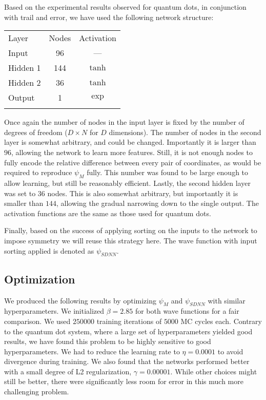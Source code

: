 \documentclass[Thesis.tex]{subfiles}
\begin{document}
Based on the experimental results observed for quantum dots, in conjunction with
trail and error, we have used the following network structure:

\begin{center}
  \begin{tabular}{lcc}
    \toprule
    \addlinespace
    Layer & Nodes & Activation\\
    \addlinespace
    \midrule
    \addlinespace
    \addlinespace
    Input & 96 & ---\\
    Hidden 1& 144 & $\tanh$\\
    Hidden 2& 36 & $\tanh$\\
    Output & 1 & $\exp$\\
    \addlinespace
    \addlinespace
    \bottomrule
  \end{tabular}
\end{center}
Once again the number of nodes in the input layer is fixed by the number of
degrees of freedom ($D\times N$ for $D$ dimensions). The number of nodes in the
second layer is somewhat arbitrary, and could be changed. Importantly it is
larger than $96$, allowing the network to learn more features. Still, it is not
enough nodes to fully encode the relative difference between every pair of
coordinates, as would be required to reproduce $\psi_M$ fully. This number was
found to be large enough to allow learning, but still be reasonably efficient.
Lastly, the second hidden layer was set to $36$ nodes. This is also somewhat
arbitrary, but importantly it is smaller than $144$, allowing the gradual
narrowing down to the single output. The activation functions are the same as
those used for quantum dots.

Finally, based on the success of applying sorting on the inputs to the network
to impose symmetry we will reuse this strategy here. The wave function with
input sorting applied is denoted as $\psi_{SDNN}$.

\subsection{Optimization}

We produced the following results by optimizing $\psi_M$ and $\psi_{SDNN}$ with
similar hyperparameters. We initialized $\beta=\num{2.85}$ for both wave functions
for a fair comparison. We used $\num{250000}$ training iterations of
$\num{5000}$ MC cycles each. Contrary to the quantum dot system, where a large
set of hyperparameters yielded good results, we have found this problem to be
highly sensitive to good hyperparameters. We had to reduce the learning rate to
$\eta=\num{0.0001}$ to avoid divergence during training. We also found that the
networks performed better with a small degree of L2 regularization,
$\gamma=\num{0.00001}$. While other choices might still be better, there were
significantly less room for error in this much more challenging problem.
\end{document}
